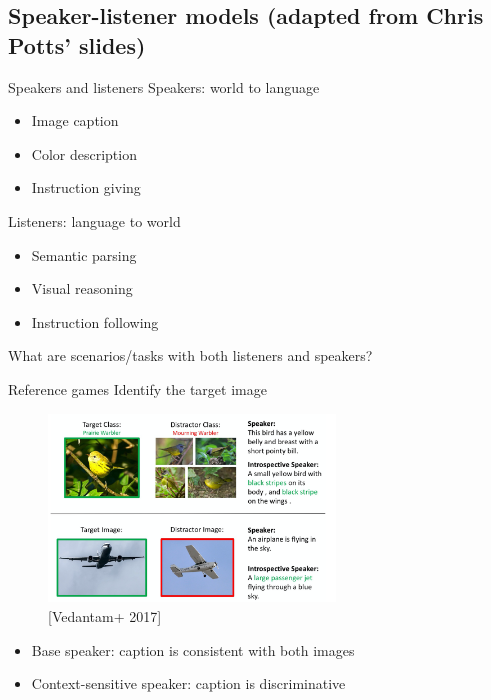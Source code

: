 \documentclass[usenames,dvipsnames,11pt,aspectratio=169]{beamer}
\begin{document}
\subsection{Speaker-listener models (adapted from Chris Potts' slides)}
\begin{frame}
    {Speakers and listeners}
    Speakers: world to language\\
    \begin{itemize}
        \item Image caption
        \item Color description
        \item Instruction giving
    \end{itemize}

    Listeners: language to world\\
    \begin{itemize}
        \item Semantic parsing
        \item Visual reasoning
        \item Instruction following
    \end{itemize}

    What are scenarios/tasks with both listeners and speakers?
\end{frame}

\begin{frame}
    {Reference games}
    Identify the target image
    \begin{figure}
        \includegraphics[height=5cm]{figures/dis-caption}
        \caption{[Vedantam+ 2017]}
    \end{figure}
    \vspace{-1em}
    \begin{itemize}
        \item Base speaker: caption is consistent with both images
        \item Context-sensitive speaker: caption is discriminative
    \end{itemize}
\end{frame}
\end{document}
